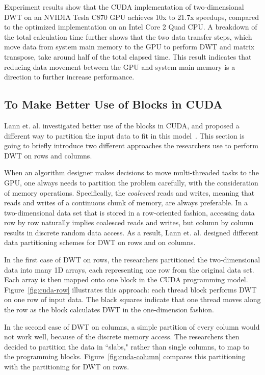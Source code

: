 Experiment results show that the CUDA implementation of 
two-dimensional DWT on an NVIDIA Tesla C870 GPU achieves 
10x to 21.7x speedups, compared to the optimized implementation 
on an Intel Core 2 Quad CPU.
%
A breakdown of the total calculation time further shows that 
the two data transfer steps, which move data from system main memory
to the GPU to perform DWT and matrix transpose, take around half
of the total elapsed time.
%
This result indicates that reducing data movement between the GPU and 
system main memory is a direction to further increase performance.  


\subsection{To Make Better Use of Blocks in CUDA}
%
Lann et. al. investigated better use of the blocks in CUDA,
and proposed a different way to partition the input data to fit in
this model~\cite{van2011accelerating}.
%
This section is going to briefly introduce two different approaches 
the researchers use to perform DWT on rows and columns.



When an algorithm designer makes decisions to move multi-threaded tasks
to the GPU, one always needs to partition the problem carefully,
with the consideration of memory operations.
%
Specifically, the \textit{coalesced} reads and writes,
meaning that reads and writes of a continuous chunk of memory,
are always preferable.
%
In a two-dimensional data set that is stored in a row-oriented fashion,
accessing data row by row naturally implies coalesced reads and writes,
but column by column results in discrete random data access.
%
As a result, Lann et. al. designed different data partitioning schemes 
for DWT on rows and on columns.


In the first case of DWT on rows, the researchers partitioned the 
two-dimensional data into many 1D arrays, each representing one row
from the original data set.
%
Each array is then mapped onto one block in the CUDA programming model.
%
Figure~\ref{fig:cuda-row} illustrates this approach: 
each thread block performs DWT on one row of input data.
%
The black squares indicate that one thread moves along the row
as the block calculates DWT in the one-dimension fashion.


In the second case of DWT on columns, a simple partition of every column
would not work well, because of the discrete memory access.
%
The researchers then decided to partition the data in ``slabs,"
rather than single columns, to map to the programming blocks.
%
Figure~\ref{fig:cuda-column} compares this partitioning with 
the partitioning for DWT on rows.


